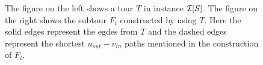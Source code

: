 \documentclass[./main.tex]{subfiles}
\begin{document}
\begin{figure}[t]
{
  }
    \caption{The figure on the left shows a tour $T$ in instance $\mathcal{I}[S]$. The figure on the right shows the subtour $F_i$ constructed by using $T$. Here the solid edges represent the egdes from $T$ and the dashed edges represent the shortest $u_{out} - v_{in}$ paths mentioned in the construction of $F_i$.}\label{fig:lift-i}
  \end{figure}
\end{document}
